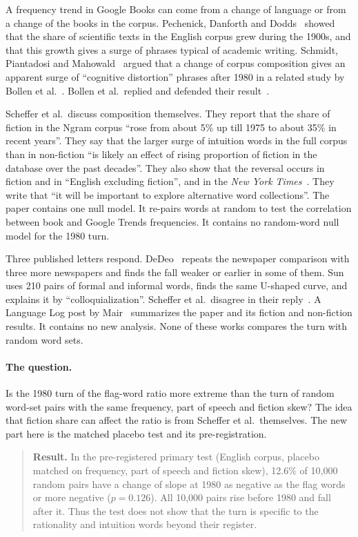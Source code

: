 \documentclass[11pt]{article}
\begin{document}
A frequency trend in Google Books can come from a change of language or from a change of the books in the corpus. Pechenick, Danforth and Dodds~\cite{pechenick} showed that the share of scientific texts in the English corpus grew during the 1900s, and that this growth gives a surge of phrases typical of academic writing. Schmidt, Piantadosi and Mahowald~\cite{schmidt} argued that a change of corpus composition gives an apparent surge of ``cognitive distortion'' phrases after 1980 in a related study by Bollen et al.~\cite{bollen}. Bollen et al.\ replied and defended their result~\cite{bollenreply}.

Scheffer et al.\ discuss composition themselves. They report that the share of fiction in the Ngram corpus ``rose from about 5\% up till 1975 to about 35\% in recent years''. They say that the larger surge of intuition words in the full corpus than in non-fiction ``is likely an effect of rising proportion of fiction in the database over the past decades''. They also show that the reversal occurs in fiction and in ``English excluding fiction'', and in the \emph{New York Times}~\cite{scheffer}. They write that ``it will be important to explore alternative word collections''. The paper contains one null model. It re-pairs words at random to test the correlation between book and Google Trends frequencies. It contains no random-word null model for the 1980 turn.

Three published letters respond. DeDeo~\cite{dedeo} repeats the newspaper comparison with three more newspapers and finds the fall weaker or earlier in some of them. Sun~\cite{sun} uses 210 pairs of formal and informal words, finds the same U-shaped curve, and explains it by ``colloquialization''. Scheffer et al.\ disagree in their reply~\cite{reply}. A Language Log post by Mair~\cite{mair} summarizes the paper and its fiction and non-fiction results. It contains no new analysis. None of these works compares the turn with random word sets.

\paragraph{The question.} Is the 1980 turn of the flag-word ratio more extreme than the turn of random word-set pairs with the same frequency, part of speech and fiction skew? The idea that fiction share can affect the ratio is from Scheffer et al.\ themselves. The new part here is the matched placebo test and its pre-registration.

\begin{quote}
\textbf{Result.} In the pre-registered primary test (English corpus, placebo matched on frequency, part of speech and fiction skew), 12.6\% of 10,000 random pairs have a change of slope at 1980 as negative as the flag words or more negative ($p = 0.126$). All 10,000 pairs rise before 1980 and fall after it. Thus the test does not show that the turn is specific to the rationality and intuition words beyond their register.
\end{quote}
\end{document}
